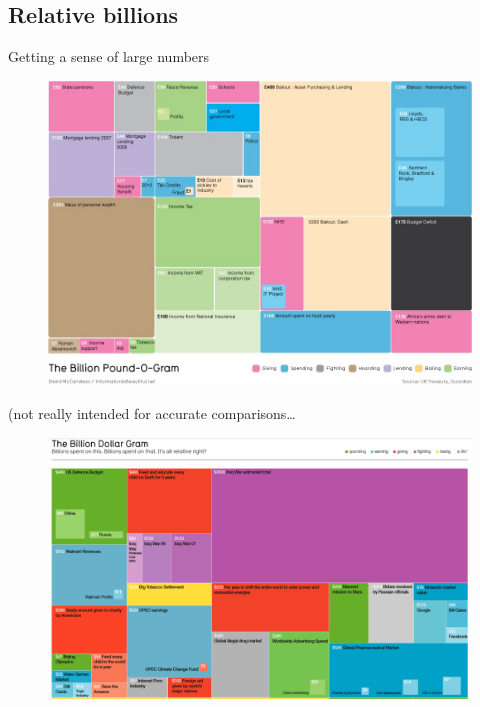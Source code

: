 \documentclass[12pt,english,pdf,dvipsnames,handout]{beamer}
\begin{document}
\subsection{Relative billions}
\begin{frame}{Getting a sense of large numbers}

\begin{figure}
  \centering
  \includegraphics[scale=0.425]{../04-graphs/04_Billion_pound_gram}
\end{figure}

\end{frame}


\begin{frame}{(not really intended for accurate comparisons\dots}

\begin{figure}
  \centering
  \includegraphics[scale=0.35]{../04-graphs/05_Billion_dollar_gram_1}
\end{figure}

\end{frame}
\end{document}
